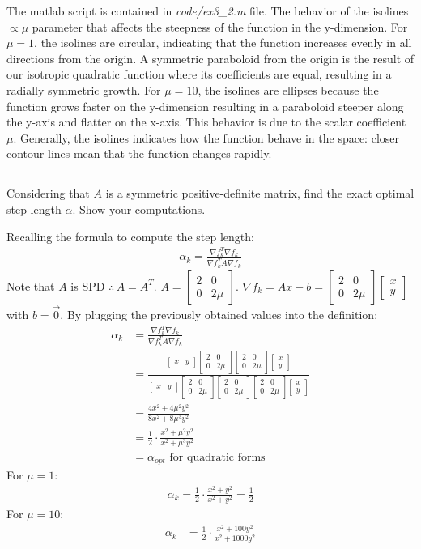 \documentclass[unicode,11pt,a4paper,oneside,numbers=endperiod,openany]{scrartcl}
\newcommand{\myvec}[1]{\begin{bmatrix} #1 \end{bmatrix}}
\newcommand{\myex}[1]{\begin{equation*}\begin{aligned} #1 \end{aligned}\end{equation*}}
\newcommand{\myexthreeA}{\myvec{2 & 0 \\ 0 & 2\mu}}
\begin{document}
The matlab script is contained in \textit{code/ex3\_2.m} file. \newline
The behavior of the isolines $\propto \mu$ parameter that affects the steepness of the function in the y-dimension.
For $\mu = 1$, the isolines are circular, indicating that the function increases evenly in all directions from the origin.
A symmetric paraboloid from the origin is the result of our isotropic quadratic function where its coefficients
are equal, resulting in a radially symmetric growth.
For $\mu = 10$, the isolines are ellipses because the function grows faster on the y-dimension resulting in a paraboloid
steeper along the y-axis and flatter on the x-axis. 
This behavior is due to the scalar coefficient $\mu$.
Generally, the isolines indicates how the function behave in the space: 
closer contour lines mean that the function changes rapidly. 

\subsection{}
Considering that $A$ is a symmetric positive-definite matrix, find the exact optimal step-length $\alpha$.
Show your computations.\newline

Recalling the formula to compute the step length:
\myex{
    \alpha_k = \frac{\nabla f_k^T \nabla f_k}{\nabla f_k^T A \nabla f_k}
}
Note that $A$ is SPD $\therefore \, A = A^T$. 
$A = \myexthreeA$. $\nabla f_k = Ax - b = \myexthreeA \myvec{x \\ y}$ with $b = \vec{0}$. \newline
By plugging the previously obtained values into the definition:
\myex{
    \alpha_k 
    & = \frac{\nabla f_k^T \nabla f_k}{\nabla f_k^T A \nabla f_k} \\
    & = \frac{\myvec{x & y} \myexthreeA \myexthreeA \myvec{x \\ y}} 
            {\myvec{x & y} \myexthreeA \myexthreeA \myexthreeA \myvec{x \\ y}} \\
    & = \frac{4x^2 + 4 \mu^2 y^2}{8x^2 + 8 \mu^3 y^2} \\
    & = \frac{1}{2} \cdot \frac{x^2 + \mu^2 y^2}{x^2 + \mu^3 y^2} \\
    & = \alpha_{opt} \text{ for quadratic forms}
}
For $\mu = 1$:
\myex{
    \alpha_k 
    = \frac{1}{2} \cdot \frac{x^2 + y^2}{x^2 + y^2}
    = \frac{1}{2}
}
For $\mu = 10$:
\myex{
    \alpha_k 
    & = \frac{1}{2} \cdot \frac{x^2 + 100 y^2}{x^2 + 1000 y^2} \\
}
\end{document}
